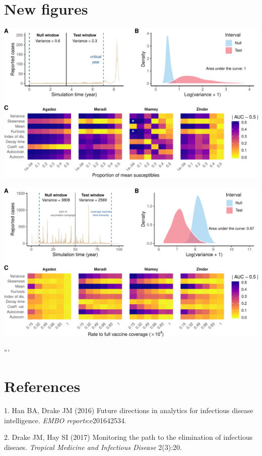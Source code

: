 \documentclass[3p]{elsarticle} %
\makeatletter
\def\maxwidth{\ifdim\Gin@nat@width>\linewidth\linewidth
\else\Gin@nat@width\fi}
\let\Oldincludegraphics\includegraphics
\renewcommand{\includegraphics}[1]{\Oldincludegraphics[width=\maxwidth]{#1}}
\makeatother
\begin{document}
\hypertarget{new-figures}{%
\section{New figures}\label{new-figures}}

\includegraphics{measles-ews-manuscript_files/figure-latex/emergence-1.pdf}

\includegraphics{measles-ews-manuscript_files/figure-latex/elimination-1.pdf}

```

\hypertarget{references}{%
\section*{References}\label{references}}

\hypertarget{refs}{}
\leavevmode\hypertarget{ref-Han2016}{}%
1. Han BA, Drake JM (2016) Future directions in analytics for infectious
disease intelligence. \emph{EMBO reports}:e201642534.

\leavevmode\hypertarget{ref-Drake2017}{}%
2. Drake JM, Hay SI (2017) Monitoring the path to the elimination of
infectious diseaes. \emph{Tropical Medicine and Infectious Disease}
2(3):20.
\end{document}
